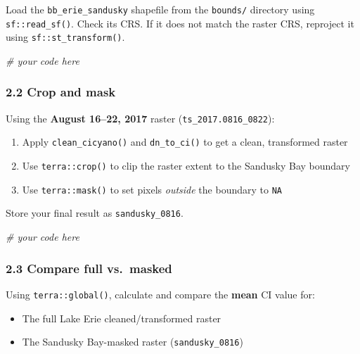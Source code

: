 \documentclass[
]{article}
\newenvironment{Shaded}{\begin{snugshade}}{\end{snugshade}}
\newcommand{\CommentTok}[1]{\textcolor[rgb]{0.56,0.35,0.01}{\textit{#1}}}
\providecommand{\tightlist}{%
  \setlength{\itemsep}{0pt}\setlength{\parskip}{0pt}}
\begin{document}
Load the \texttt{bb\_erie\_sandusky} shapefile from the \texttt{bounds/}
directory using \texttt{sf::read\_sf()}. Check its CRS. If it does not
match the raster CRS, reproject it using \texttt{sf::st\_transform()}.

\begin{Shaded}
\begin{Highlighting}[]
\CommentTok{\# your code here}
\end{Highlighting}
\end{Shaded}

\subsubsection{2.2 Crop and mask}\label{crop-and-mask}

Using the \textbf{August 16--22, 2017} raster
(\texttt{ts\_2017.0816\_0822}):

\begin{enumerate}
\def\labelenumi{\arabic{enumi}.}
\tightlist
\item
  Apply \texttt{clean\_cicyano()} and \texttt{dn\_to\_ci()} to get a
  clean, transformed raster
\item
  Use \texttt{terra::crop()} to clip the raster extent to the Sandusky
  Bay boundary
\item
  Use \texttt{terra::mask()} to set pixels \emph{outside} the boundary
  to \texttt{NA}
\end{enumerate}

Store your final result as \texttt{sandusky\_0816}.

\begin{Shaded}
\begin{Highlighting}[]
\CommentTok{\# your code here}
\end{Highlighting}
\end{Shaded}

\subsubsection{2.3 Compare full
vs.~masked}\label{compare-full-vs.-masked}

Using \texttt{terra::global()}, calculate and compare the \textbf{mean}
CI value for:

\begin{itemize}
\tightlist
\item
  The full Lake Erie cleaned/transformed raster
\item
  The Sandusky Bay-masked raster (\texttt{sandusky\_0816})
\end{itemize}
\end{document}
